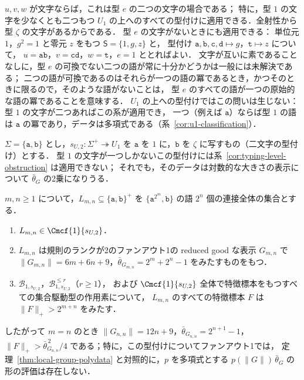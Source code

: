 $u,v,w$ が文字ならば，これは型 $e$ の二つの文字の場合である；
特に，型 $1$ の文字を少なくとも二つもつ $U_1$ の上へのすべての型付けに適用できる．全射性から型 $\zeta$ の文字があるからである．
型 $e$ の文字がないときにも適用できる：
単位元 $1$，$g^2=1$ と零元 $z$ をもつ $\mathsf S=\{1,g,z\}$ と，
型付け $\mathtt a,\mathtt b,\mathtt c,\mathtt d\mapsto g$，$\mathtt t\mapsto z$ について，
$u=\mathtt{ab}$，$v=\mathtt{cd}$，$w=\mathtt t$，$e=1$ ととればよい．
文字が互いに素であることなしに，型 $e$ の可換でない二つの語が常に十分かどうかは一般には未解決である；
二つの語が可換であるのはそれらが一つの語の冪であるとき，かつそのときに限るので，そのような語がないことは，
型 $e$ のすべての語が一つの原始的な語の冪であることを意味する．
$U_1$ の上への型付けではこの問いは生じない：型 $1$ の文字が二つあればこの系が適用でき，
一つ（例えば $\mathtt a$）ならば型 $1$ の語は $\mathtt a$ の冪であり，データは多項式である（系~\ref{cor:u1-classification}）．

$\Sigma=\{\mathtt a,\mathtt b\}$ とし，$s_{U,2}:\Sigma^+\twoheadrightarrow U_1$ を $\mathtt a$ を
$1$ に，$\mathtt b$ を $\zeta$ に写すもの（二文字の型付け）とする．
型 $1$ の文字が一つしかないこの型付けには系~\ref{cor:typing-level-obstruction} は適用できない；
それでも，そのデータは対数的な大きさの表示について $\bar\theta_G$ の2乗になりうる．

\begin{proposition}
\label{prop:binary-u1-quadratic}
$m,n\ge1$ について，$L_{m,n}\subseteq\{\mathtt a,\mathtt b\}^+$ を
$\{\mathtt a^{2^m},\mathtt b\}$ の語 $2^n$ 個の連接全体の集合とする．
\begin{enumerate}[label=\textup{(\roman*)},leftmargin=*]
\item $L_{m,n}\in\Cmcf{1}{s_{U,2}}$．
\item $L_{m,n}$ は規則のランクが2のファンアウト1の reduced good な表示 $G_{m,n}$ で
$\|G_{m,n}\|=6m+6n+9$，$\bar\theta_{G_{m,n}}=2^m+2^n-1$ をみたすものをもつ．
\item $\mathcal B_{1,s_{U,2}}$，$\mathcal B^{\le r}_{1,s_{U,2}}$（$r\ge1$），
および $\Cmcf{1}{s_{U,2}}$ 全体で特徴標本をもつすべての集合駆動型の作用素について，
$L_{m,n}$ のすべての特徴標本 $F$ は $\|F\|_+>2^{m+n}$ をみたす．
\end{enumerate}
したがって $m=n$ のとき $\|G_{n,n}\|=12n+9$，$\bar\theta_{G_{n,n}}=2^{n+1}-1$，
$\|F\|_+>\bar\theta_{G_{n,n}}^{\,2}/4$ である；特に，この型付けについてファンアウト1では，
定理~\ref{thm:local-group-polydata} と対照的に，$p$ を多項式とする $p(\|G\|)\,\bar\theta_G$ の形の評価は存在しない．
\end{proposition}

